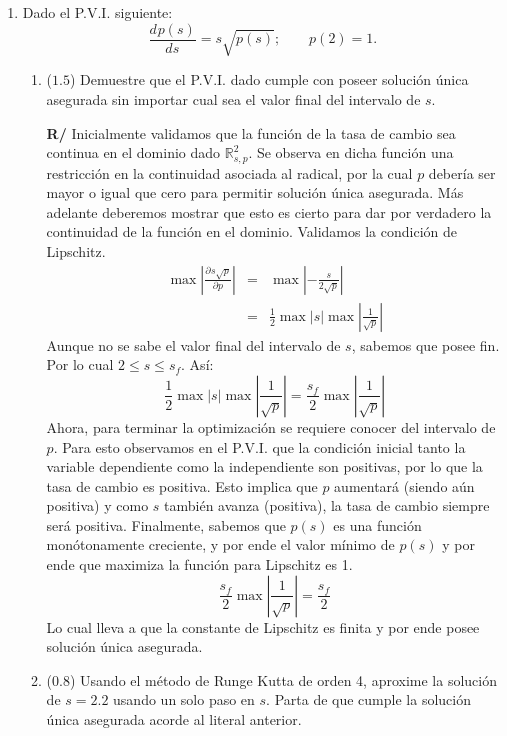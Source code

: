 \documentclass[12pt]{article}
\newcommand{\R}{\ensuremath{\mathbb{R}}}
\newcommand{\diff}[3]{\frac{d^{#3} #1}{d#2^{#3}}}
\newcommand{\pdiff}[3]{\frac{\partial^{#3} #1}{\partial#2^{#3}}}
\begin{document}
\vspace{-.5cm}
  \begin{enumerate}[leftmargin=*,widest=9]
    \item Dado el P.V.I. siguiente:
    \[
      \diff{p(s)}{s}{} = s\sqrt{p(s)};\qquad
      p(2) = 1.
    \]
    \begin{enumerate}[label=\alph*]
    \item (\(1.5\)) Demuestre que el P.V.I. dado cumple con poseer solución única asegurada sin importar cual sea el valor final del intervalo de \(s\).

\textbf{R/} Inicialmente validamos que la función de la tasa de cambio sea continua en el dominio dado \(\R^2_{s,p}\). Se observa en dicha función una restricción en la continuidad asociada al radical, por la cual \(p\) debería ser mayor o igual que cero para permitir solución única asegurada. Más adelante deberemos mostrar que esto es cierto para dar por verdadero la continuidad de la función en el dominio.
    Validamos la condición de Lipschitz.
    \begin{eqnarray*}
\max \left\vert \pdiff{s\sqrt{p}}{p}{} \right\vert &= &\max \left\vert -\frac{s}{2\sqrt{p}}\right\vert\\
& = & \frac{1}{2}\max \vert s\vert \max \left\vert \frac{1}{\sqrt{p}} \right\vert
    \end{eqnarray*}
    Aunque no se sabe el valor final del intervalo de \(s\), sabemos que posee fin. Por lo cual \(2 \leq s \leq s_f\). Así:
    \[
\frac{1}{2}\max \vert s\vert \max \left\vert \frac{1}{\sqrt{p}} \right\vert = \frac{s_f}{2}\max\left\vert \frac{1}{\sqrt{p}} \right\vert
    \]
Ahora, para terminar la optimización se requiere conocer del intervalo de \(p\). Para esto observamos en el P.V.I. que la condición inicial tanto la variable dependiente como la independiente son positivas, por lo que la tasa de cambio es positiva. Esto implica que \(p\) aumentará (siendo aún positiva) y como \(s\) también avanza (positiva), la tasa de cambio siempre será positiva.
Finalmente, sabemos que \(p(s)\) es una función monótonamente creciente, y por ende el valor mínimo de \(p(s)\) y por ende que maximiza la función para Lipschitz es 1.
\[
\frac{s_f}{2}\max\left\vert \frac{1}{\sqrt{p}} \right\vert = \frac{s_f}{2}
\]
Lo cual lleva a que la constante de Lipschitz es finita y por ende posee solución única asegurada.
    \item (\(0.8\)) Usando el método de Runge Kutta de orden 4, aproxime la solución de \(s=2.2\) usando un solo paso en \(s\). Parta de que cumple la solución única asegurada acorde al literal anterior.


\end{enumerate}
\end{enumerate}
\end{document}
